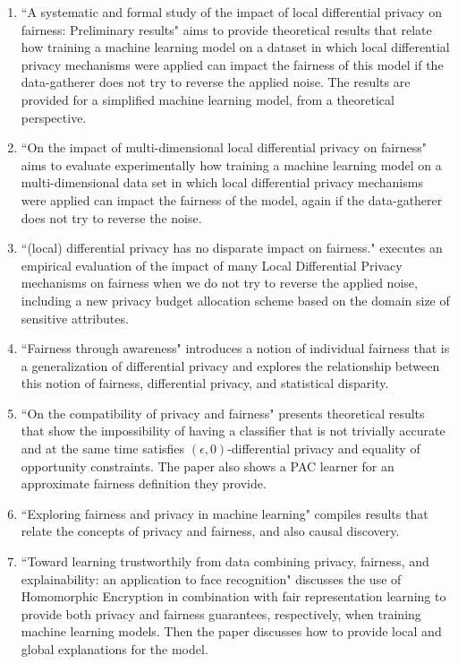 \documentclass[conference]{IEEEtran}
\newcommand{\qm}[1]{``#1"}
\begin{document}
\begin{enumerate}
	\item \qm{A systematic and formal study of the impact of local differential privacy on fairness: Preliminary results} \cite{makhlouf2024systematicformalstudyimpact} aims to provide theoretical results that relate how training a machine learning model on a dataset in which local differential privacy mechanisms were applied can impact the fairness of this model if the data-gatherer does not try to reverse the applied noise. The results are provided for a simplified machine learning model, from a theoretical perspective.
	\item \qm{On the impact of multi-dimensional local differential privacy on fairness} \cite{makhlouf2024impact} aims to evaluate experimentally how training a machine learning model on a multi-dimensional data set in which local differential privacy mechanisms were applied can impact the fairness of the model, again if the data-gatherer does not try to reverse the noise.
	\item \qm{(local) differential privacy has no disparate impact on fairness.} \cite{arcolezi2023local} executes an empirical evaluation of the impact of many Local Differential Privacy mechanisms on fairness when we do not try to reverse the applied noise, including a new privacy budget allocation scheme based on the domain size of sensitive attributes.
	\item \qm{Fairness through awareness} \cite{Awareness} introduces a notion of individual fairness that is a generalization of differential privacy and explores the relationship between this notion of fairness, differential privacy, and statistical disparity.
	\item \qm{On the compatibility of privacy and fairness} \cite{Rachel} presents theoretical results that show the impossibility of having a classifier that is not trivially accurate and at the same time satisfies $(\epsilon,0)$-differential privacy and equality of opportunity constraints. The paper also shows a PAC learner for an approximate fairness definition they provide.
	\item \qm{Exploring fairness and privacy in machine learning} \cite{henao2023exploring} compiles results that relate the concepts of privacy and fairness, and also causal discovery.
	\item \qm{Toward learning trustworthily from data combining privacy, fairness, and explainability: an application to face recognition} \cite{franco2021toward} discusses the use of Homomorphic Encryption in combination with fair representation learning \cite{zemel2013learning} to provide both privacy and fairness guarantees, respectively, when training machine learning models. Then the paper discusses how to provide local and global explanations for the model.
\end{enumerate}
\end{document}

